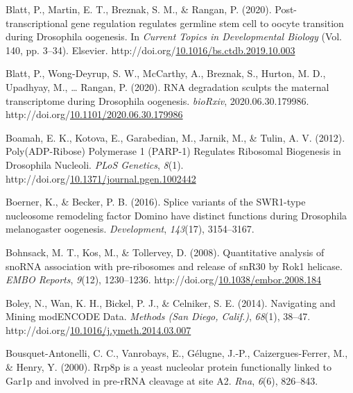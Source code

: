 \documentclass[12pt,oneside]{reedthesis}
\newlength{\cslhangindent}
\newenvironment{CSLReferences}[2] %
 {%
  \setlength{\parindent}{0pt}
  \ifodd #1 \everypar{\setlength{\hangindent}{\cslhangindent}}\ignorespaces\fi
  \ifnum #2 > 0
  \setlength{\parskip}{#2\baselineskip}
  \fi
 }%
 {}
\begin{document}
\begin{CSLReferences}{1}{0}
\leavevmode{}%
Blatt, P., Martin, E. T., Breznak, S. M., \& Rangan, P. (2020). Post-transcriptional gene regulation regulates germline stem cell to oocyte transition during {Drosophila} oogenesis. In \emph{Current {Topics} in {Developmental Biology}} (Vol. 140, pp. 3--34). {Elsevier}. http://doi.org/\href{https://doi.org/10.1016/bs.ctdb.2019.10.003}{10.1016/bs.ctdb.2019.10.003}

\leavevmode{}%
Blatt, P., Wong-Deyrup, S. W., McCarthy, A., Breznak, S., Hurton, M. D., Upadhyay, M., \ldots{} Rangan, P. (2020). {RNA} degradation sculpts the maternal transcriptome during {Drosophila} oogenesis. \emph{bioRxiv}, 2020.06.30.179986. http://doi.org/\href{https://doi.org/10.1101/2020.06.30.179986}{10.1101/2020.06.30.179986}

\leavevmode{}%
Boamah, E. K., Kotova, E., Garabedian, M., Jarnik, M., \& Tulin, A. V. (2012). Poly({ADP}-{Ribose}) {Polymerase} 1 ({PARP}-1) {Regulates Ribosomal Biogenesis} in {Drosophila Nucleoli}. \emph{PLoS Genetics}, \emph{8}(1). http://doi.org/\href{https://doi.org/10.1371/journal.pgen.1002442}{10.1371/journal.pgen.1002442}

\leavevmode{}%
Boerner, K., \& Becker, P. B. (2016). Splice variants of the {SWR1}-type nucleosome remodeling factor {Domino} have distinct functions during {Drosophila} melanogaster oogenesis. \emph{Development}, \emph{143}(17), 3154--3167.

\leavevmode{}%
Bohnsack, M. T., Kos, M., \& Tollervey, D. (2008). Quantitative analysis of {snoRNA} association with pre-ribosomes and release of {snR30} by {Rok1} helicase. \emph{EMBO Reports}, \emph{9}(12), 1230--1236. http://doi.org/\href{https://doi.org/10.1038/embor.2008.184}{10.1038/embor.2008.184}

\leavevmode{}%
Boley, N., Wan, K. H., Bickel, P. J., \& Celniker, S. E. (2014). Navigating and {Mining modENCODE Data}. \emph{Methods (San Diego, Calif.)}, \emph{68}(1), 38--47. http://doi.org/\href{https://doi.org/10.1016/j.ymeth.2014.03.007}{10.1016/j.ymeth.2014.03.007}

\leavevmode{}%
Bousquet-Antonelli, C. C., Vanrobays, E., Gélugne, J.-P., Caizergues-Ferrer, M., \& Henry, Y. (2000). Rrp8p is a yeast nucleolar protein functionally linked to {Gar1p} and involved in pre-{rRNA} cleavage at site {A2}. \emph{Rna}, \emph{6}(6), 826--843.


\end{CSLReferences}
\end{document}
